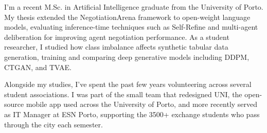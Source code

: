 

\begin{cvparagraph}

I'm a recent M.Sc. in Artificial Intelligence graduate from the University of Porto. My thesis extended the NegotiationArena framework to open-weight language models, evaluating inference-time techniques such as Self-Refine and multi-agent deliberation for improving agent negotiation performance. As a student researcher, I studied how class imbalance affects synthetic tabular data generation, training and comparing deep generative models including DDPM, CTGAN, and TVAE.

Alongside my studies, I've spent the past few years volunteering across several student associations. I was part of the small team that redesigned UNI, the open-source mobile app used across the University of Porto, and more recently served as IT Manager at ESN Porto, supporting the 3500+ exchange students who pass through the city each semester. 

\end{cvparagraph}
